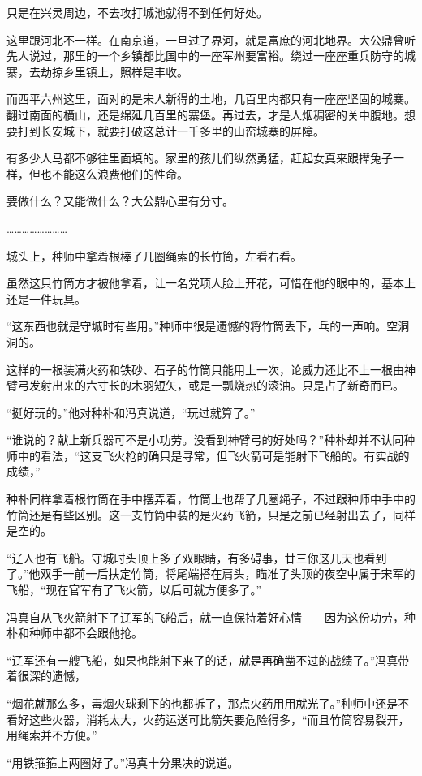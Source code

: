 只是在兴灵周边，不去攻打城池就得不到任何好处。

这里跟河北不一样。在南京道，一旦过了界河，就是富庶的河北地界。大公鼎曾听先人说过，那里的一个乡镇都比国中的一座军州要富裕。绕过一座座重兵防守的城寨，去劫掠乡里镇上，照样是丰收。

而西平六州这里，面对的是宋人新得的土地，几百里内都只有一座座坚固的城寨。翻过南面的横山，还是绵延几百里的寨堡。再过去，才是人烟稠密的关中腹地。想要打到长安城下，就要打破这总计一千多里的山峦城寨的屏障。

有多少人马都不够往里面填的。家里的孩儿们纵然勇猛，赶起女真来跟撵兔子一样，但也不能这么浪费他们的性命。

要做什么？又能做什么？大公鼎心里有分寸。

……………………

城头上，种师中拿着根棒了几圈绳索的长竹筒，左看右看。

虽然这只竹筒方才被他拿着，让一名党项人脸上开花，可惜在他的眼中的，基本上还是一件玩具。

“这东西也就是守城时有些用。”种师中很是遗憾的将竹筒丢下，乓的一声响。空洞洞的。

这样的一根装满火药和铁砂、石子的竹筒只能用上一次，论威力还比不上一根由神臂弓发射出来的六寸长的木羽短矢，或是一瓢烧热的滚油。只是占了新奇而已。

“挺好玩的。”他对种朴和冯真说道，“玩过就算了。”

“谁说的？献上新兵器可不是小功劳。没看到神臂弓的好处吗？”种朴却并不认同种师中的看法，“这支飞火枪的确只是寻常，但飞火箭可是能射下飞船的。有实战的成绩，”

种朴同样拿着根竹筒在手中摆弄着，竹筒上也帮了几圈绳子，不过跟种师中手中的竹筒还是有些区别。这一支竹筒中装的是火药飞箭，只是之前已经射出去了，同样是空的。

“辽人也有飞船。守城时头顶上多了双眼睛，有多碍事，廿三你这几天也看到了。”他双手一前一后扶定竹筒，将尾端搭在肩头，瞄准了头顶的夜空中属于宋军的飞船，“现在官军有了飞火箭，以后可就方便多了。”

冯真自从飞火箭射下了辽军的飞船后，就一直保持着好心情——因为这份功劳，种朴和种师中都不会跟他抢。

“辽军还有一艘飞船，如果也能射下来了的话，就是再确凿不过的战绩了。”冯真带着很深的遗憾，

“烟花就那么多，毒烟火球剩下的也都拆了，那点火药用用就光了。”种师中还是不看好这些火器，消耗太大，火药运送可比箭矢要危险得多，“而且竹筒容易裂开，用绳索并不方便。”

“用铁箍箍上两圈好了。”冯真十分果决的说道。

